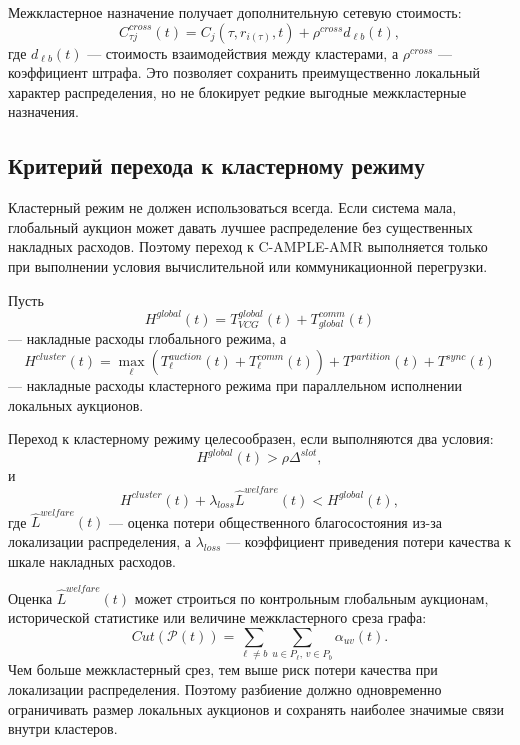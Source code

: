 Межкластерное назначение получает дополнительную сетевую стоимость:
\begin{equation}
    C^{cross}_{\tau j}(t)=C_j(\tau,r_{i(\tau)},t)+\rho^{cross}d_{\ell b}(t),
    \label{eq:ch5_cross_cost}
\end{equation}
где $d_{\ell b}(t)$ --- стоимость взаимодействия между кластерами, а $\rho^{cross}$ --- коэффициент штрафа. Это позволяет сохранить преимущественно локальный характер распределения, но не блокирует редкие выгодные межкластерные назначения.

\subsection{Критерий перехода к кластерному режиму}

Кластерный режим не должен использоваться всегда. Если система мала, глобальный аукцион может давать лучшее распределение без существенных накладных расходов. Поэтому переход к C-AMPLE-AMR выполняется только при выполнении условия вычислительной или коммуникационной перегрузки.

Пусть
\begin{equation}
    H^{global}(t)=T^{global}_{VCG}(t)+T^{comm}_{global}(t)
    \label{eq:ch5_global_overhead}
\end{equation}
--- накладные расходы глобального режима, а
\begin{equation}
    H^{cluster}(t)=\max_{\ell}\left(T^{auction}_{\ell}(t)+T^{comm}_{\ell}(t)\right)+T^{partition}(t)+T^{sync}(t)
    \label{eq:ch5_cluster_overhead}
\end{equation}
--- накладные расходы кластерного режима при параллельном исполнении локальных аукционов.

Переход к кластерному режиму целесообразен, если выполняются два условия:
\begin{equation}
    H^{global}(t)>\rho\Delta^{slot},
    \label{eq:ch5_cluster_condition_1}
\end{equation}
и
\begin{equation}
    H^{cluster}(t)+\lambda_{loss}\widehat{L}^{welfare}(t)<H^{global}(t),
    \label{eq:ch5_cluster_condition_2}
\end{equation}
где $\widehat{L}^{welfare}(t)$ --- оценка потери общественного благосостояния из-за локализации распределения, а $\lambda_{loss}$ --- коэффициент приведения потери качества к шкале накладных расходов.

Оценка $\widehat{L}^{welfare}(t)$ может строиться по контрольным глобальным аукционам, исторической статистике или величине межкластерного среза графа:
\begin{equation}
    Cut(\mathcal{P}(t))=\sum_{\ell\neq b}\sum_{u\in P_\ell,\,v\in P_b}\alpha_{uv}(t).
    \label{eq:ch5_partition_cut}
\end{equation}
Чем больше межкластерный срез, тем выше риск потери качества при локализации распределения. Поэтому разбиение должно одновременно ограничивать размер локальных аукционов и сохранять наиболее значимые связи внутри кластеров.

